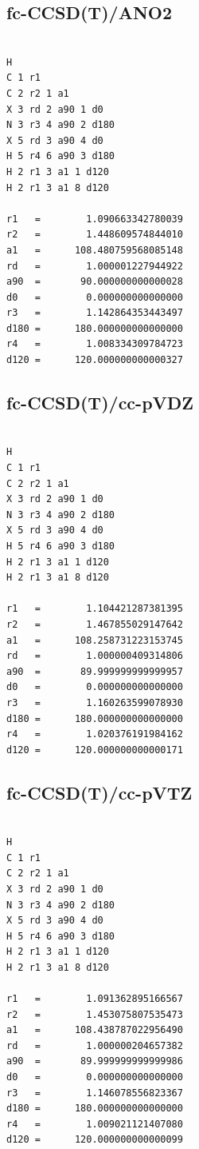 \documentclass[preprint,12pt]{elsarticle}
\begin{document}
\subsection*{fc-CCSD(T)/ANO2}
\begin{verbatim}

H
C 1 r1
C 2 r2 1 a1
X 3 rd 2 a90 1 d0
N 3 r3 4 a90 2 d180
X 5 rd 3 a90 4 d0
H 5 r4 6 a90 3 d180
H 2 r1 3 a1 1 d120
H 2 r1 3 a1 8 d120

r1   =        1.090663342780039
r2   =        1.448609574844010
a1   =      108.480759568085148
rd   =        1.000001227944922
a90  =       90.000000000000028
d0   =        0.000000000000000
r3   =        1.142864353443497
d180 =      180.000000000000000
r4   =        1.008334309784723
d120 =      120.000000000000327

\end{verbatim}

\subsection*{fc-CCSD(T)/cc-pVDZ}
\begin{verbatim}

H
C 1 r1
C 2 r2 1 a1
X 3 rd 2 a90 1 d0
N 3 r3 4 a90 2 d180
X 5 rd 3 a90 4 d0
H 5 r4 6 a90 3 d180
H 2 r1 3 a1 1 d120
H 2 r1 3 a1 8 d120

r1   =        1.104421287381395
r2   =        1.467855029147642
a1   =      108.258731223153745
rd   =        1.000000409314806
a90  =       89.999999999999957
d0   =        0.000000000000000
r3   =        1.160263599078930
d180 =      180.000000000000000
r4   =        1.020376191984162
d120 =      120.000000000000171

\end{verbatim}

\subsection*{fc-CCSD(T)/cc-pVTZ}
\begin{verbatim}

H
C 1 r1
C 2 r2 1 a1
X 3 rd 2 a90 1 d0
N 3 r3 4 a90 2 d180
X 5 rd 3 a90 4 d0
H 5 r4 6 a90 3 d180
H 2 r1 3 a1 1 d120
H 2 r1 3 a1 8 d120

r1   =        1.091362895166567
r2   =        1.453075807535473
a1   =      108.438787022956490
rd   =        1.000000204657382
a90  =       89.999999999999986
d0   =        0.000000000000000
r3   =        1.146078556823367
d180 =      180.000000000000000
r4   =        1.009021121407080
d120 =      120.000000000000099

\end{verbatim}
\end{document}
